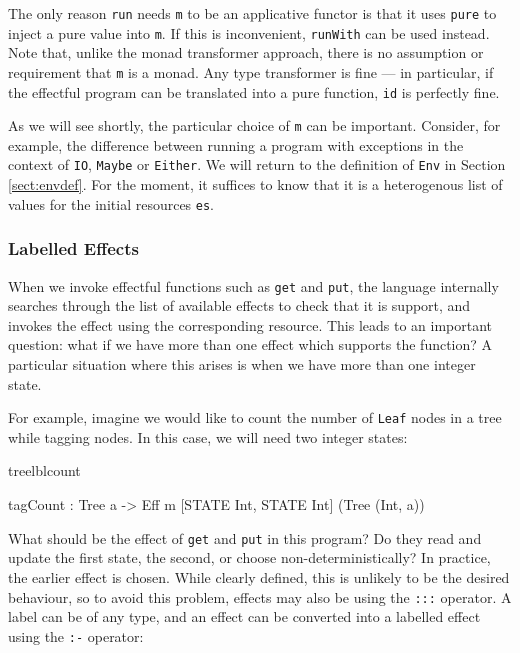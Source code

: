 \noindent
The only reason \texttt{run} needs \texttt{m} to be an applicative functor
is that it uses \texttt{pure} to inject a pure value into \texttt{m}. If this
is inconvenient, \texttt{runWith} can be used instead. Note that, unlike the
monad transformer approach, there is no assumption or requirement that
\texttt{m} is a monad. Any type transformer is fine --- in particular,
if the effectful program can be translated into a pure function, \texttt{id}
is perfectly fine.

As we will see shortly, the particular choice of \texttt{m} can be
important. Consider, for example, the difference between running a program with
exceptions in the context of \texttt{IO}, \texttt{Maybe} or \texttt{Either}.
%
We will return to the definition of \texttt{Env} in Section \ref{sect:envdef}.
For the moment, it suffices to know that it is a heterogenous list of values
for the initial resources \texttt{es}.

\subsubsection{Labelled Effects}

When we invoke effectful functions such as \texttt{get} and \texttt{put},
the \Eff{} language internally searches through the list of available effects
to check that it is support, and invokes the effect using the corresponding
resource. This leads to an important question: what if we have more than one 
effect which supports the function? A particular situation where this arises
is when we have more than one integer state.

For example, imagine we would like to count the number of \texttt{Leaf} nodes
in a tree while tagging nodes.  In this case, we will need two integer states:

\begin{SaveVerbatim}{treelblcount}

tagCount : Tree a -> 
     Eff m [STATE Int, STATE Int] (Tree (Int, a))

\end{SaveVerbatim}

What should be the effect of \texttt{get} and \texttt{put} in this program?
Do they read and update the first state, the second, or choose
non-deterministically? 
%
In practice, the earlier effect is chosen. While clearly defined, this is
unlikely to be the desired behaviour, so 
to avoid this problem, effects may also be  using the
\texttt{:::} operator.  A label can be of any type, and an
effect can be converted into a labelled effect using the \texttt{:-}
operator:

